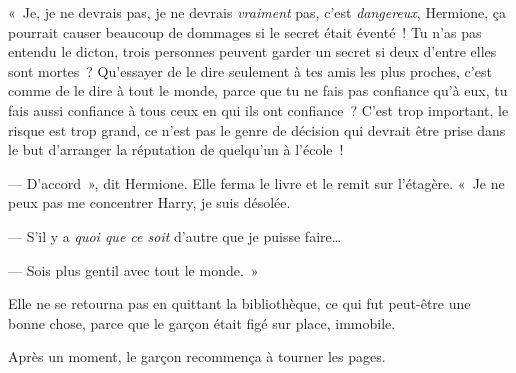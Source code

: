 «~Je, je ne devrais pas, je ne devrais \emph{vraiment} pas, c'est \emph{dangereux}, Hermione, ça pourrait causer beaucoup de dommages si le secret était éventé~! Tu n'as pas entendu le dicton, trois personnes peuvent garder un secret si deux d'entre elles sont mortes~? Qu'essayer de le dire seulement à tes amis les plus proches, c'est comme de le dire à tout le monde, parce que tu ne fais pas confiance qu'à eux, tu fais aussi confiance à tous ceux en qui ils ont confiance~? C'est trop important, le risque est trop grand, ce n'est pas le genre de décision qui devrait être prise dans le but d'arranger la réputation de quelqu'un à l'école~!

--- D'accord~», dit Hermione. Elle ferma le livre et le remit sur l'étagère. «~Je ne peux pas me concentrer Harry, je suis désolée.

--- S'il y a \emph{quoi que ce soit} d'autre que je puisse faire…

--- Sois plus gentil avec tout le monde.~»

Elle ne se retourna pas en quittant la bibliothèque, ce qui fut peut-être une bonne chose, parce que le garçon était figé sur place, immobile.

Après un moment, le garçon recommença à tourner les pages.
